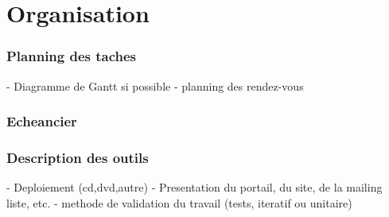 \chapter{Organisation}



\subsection{Planning des taches}

- Diagramme de Gantt si possible
- planning des rendez-vous


\subsection{Echeancier}


\subsection{Description des outils}

- Deploiement (cd,dvd,autre)
- Presentation du portail, du site, de la mailing liste, etc.
- methode de validation du travail (tests, iteratif ou unitaire)




